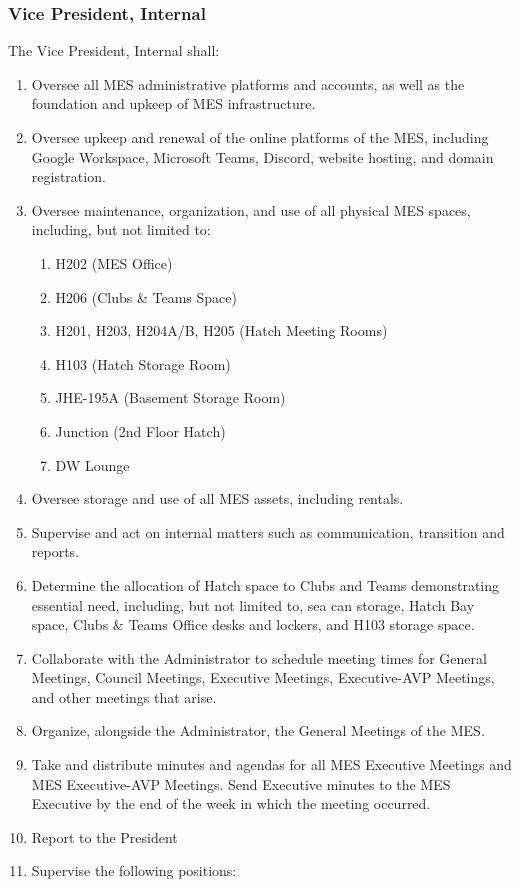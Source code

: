 \subsubsection{Vice President,
 Internal}
\label{vice-president-internal}
The Vice President, Internal shall:

\begin{enumerate}
 \item
  Oversee all MES administrative platforms and accounts, as well as the
  foundation and upkeep of MES infrastructure.
 \item
  Oversee upkeep and renewal of the online platforms of the MES,
  including Google Workspace, Microsoft Teams, Discord, website hosting,
  and domain registration.
 \item
  Oversee maintenance, organization, and use of all physical MES spaces,
  including, but not limited to:

  \begin{enumerate}
   \item
    H202 (MES Office)
   \item
    H206 (Clubs \& Teams Space)
   \item
    H201, H203, H204A/B, H205 (Hatch Meeting Rooms)
   \item
    H103 (Hatch Storage Room)
   \item
    JHE-195A (Basement Storage Room)
   \item
    Junction (2nd Floor Hatch)
   \item
    DW Lounge
  \end{enumerate}
 \item
  Oversee storage and use of all MES assets, including rentals.
 \item
  Supervise and act on internal matters such as communication,
  transition and reports.
 \item
  Determine the allocation of Hatch space to Clubs and Teams
  demonstrating essential need, including, but not limited to, sea can
  storage, Hatch Bay space, Clubs \& Teams Office desks and lockers, and
  H103 storage space.
 \item
  Collaborate with the Administrator to schedule meeting times for
  General Meetings, Council Meetings, Executive Meetings, Executive-AVP
  Meetings, and other meetings that arise.
 \item
  Organize, alongside the Administrator, the General Meetings of the
  MES.
 \item
  Take and distribute minutes and agendas for all MES Executive Meetings
  and MES Executive-AVP Meetings. Send Executive minutes to the MES
  Executive by the end of the week in which the meeting occurred.
 \item
  Report to the President
 \item
  Supervise the following positions:


\end{enumerate}
